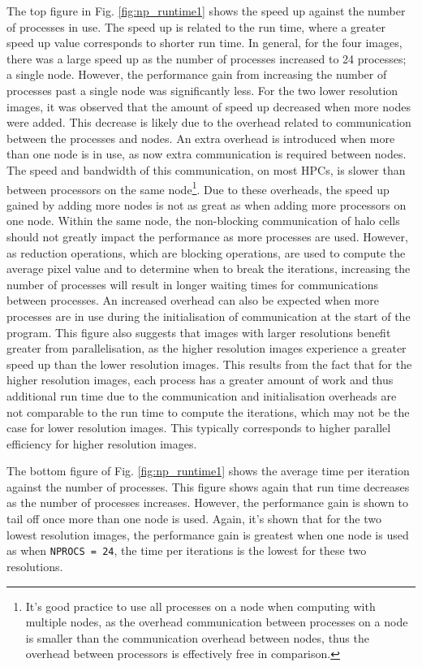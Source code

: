 \documentclass[11pt, a4paper]{article}
\begin{document}
			The top figure in Fig. \ref{fig:np_runtime1} shows the speed up against the number of processes in use. The speed up is related to the run time, where a greater speed up value corresponds to shorter run time. In general, for the four images, there was a large speed up as the number of processes increased to 24 processes; a single node. However, the performance gain from increasing the number of processes past a single node was significantly less. For the two lower resolution images, it was observed that the amount of speed up decreased when more nodes were added. This decrease is likely due to the overhead related to communication between the processes and nodes. An extra overhead is introduced when more than one node is in use, as now extra communication is required between nodes. The speed and bandwidth of this communication, on most HPCs, is slower than between processors on the same node\footnote{It's good practice to use all processes on a node when computing with multiple nodes, as the overhead communication between processes on a node is smaller than the communication overhead between nodes, thus the overhead between processors is effectively free in comparison.}. Due to these overheads, the speed up gained by adding more  nodes is not as great as when adding more processors on one node. Within the same node, the non-blocking communication of halo cells should not greatly impact the performance as more processes are used. However, as reduction operations, which are blocking operations, are used to compute the average pixel value and to determine when to break the iterations, increasing the number of processes will result in longer waiting times for communications between processes. An increased overhead can also be expected when more processes are in use during the initialisation of communication at the start of the program. This figure also suggests that images with larger resolutions benefit greater from parallelisation, as the higher resolution images experience a greater speed up than the lower resolution images. This results from the fact that for the higher resolution images, each process has a greater amount of work and thus additional run time due to the communication and initialisation overheads are not comparable to the run time to compute the iterations, which may not be the case for lower resolution images. This typically corresponds to higher parallel efficiency for higher resolution images.
			
			The bottom figure of Fig. \ref{fig:np_runtime1} shows the average time per iteration against the number of processes. This figure shows again that run time decreases as the number of processes increases. However, the performance gain is shown to tail off once more than one node is used. Again, it's shown that for the two lowest resolution images, the performance gain is greatest when one node is used as when \texttt{NPROCS = 24}, the time per iterations is the lowest for these two resolutions.
			
\end{document}
